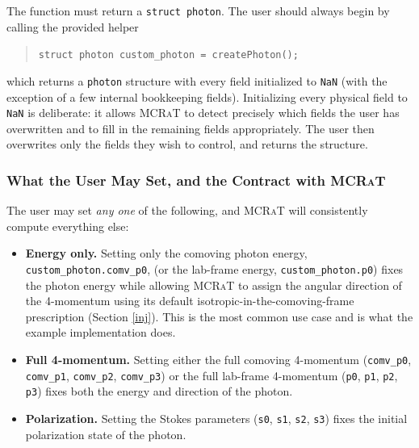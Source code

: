 \documentclass[12pt,a4paper]{article}
\newcommand{\mcrat}{\textsc{MCRaT}}
\begin{document}
The function must return a \texttt{struct photon}. The user should always begin by calling the provided helper
\begin{quotation}
	\texttt{struct photon custom\_photon = createPhoton();}
\end{quotation}
which returns a \texttt{photon} structure with every field initialized to \texttt{NaN} (with the exception of a few internal bookkeeping fields). Initializing every physical field to \texttt{NaN} is deliberate: it allows \mcrat{} to detect precisely which fields the user has overwritten and to fill in the remaining fields appropriately. The user then overwrites only the fields they wish to control, and returns the structure.

\subsubsection{What the User May Set, and the Contract with \mcrat{}}
The user may set \emph{any one} of the following, and \mcrat{} will consistently compute everything else:
\begin{itemize}
	\item \textbf{Energy only.} Setting only the comoving photon energy, \texttt{custom\_photon.comv\_p0}, (or the lab-frame energy, \texttt{custom\_photon.p0}) fixes the photon energy while allowing \mcrat{} to assign the angular direction of the 4-momentum using its default isotropic-in-the-comoving-frame prescription (Section \ref{inj}). This is the most common use case and is what the example implementation does.
	\item \textbf{Full 4-momentum.} Setting either the full comoving 4-momentum (\texttt{comv\_p0}, \texttt{comv\_p1}, \texttt{comv\_p2}, \texttt{comv\_p3}) or the full lab-frame 4-momentum (\texttt{p0}, \texttt{p1}, \texttt{p2}, \texttt{p3}) fixes both the energy and direction of the photon.
	\item \textbf{Polarization.} Setting the Stokes parameters (\texttt{s0}, \texttt{s1}, \texttt{s2}, \texttt{s3}) fixes the initial polarization state of the photon.
\end{itemize}
\end{document}
